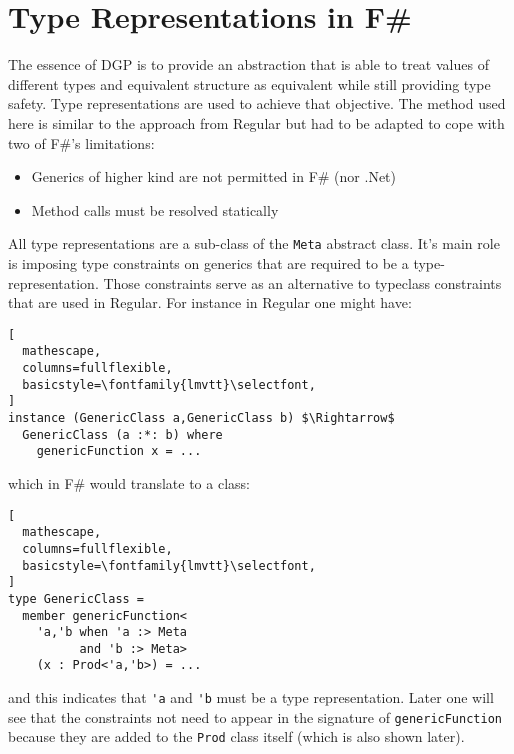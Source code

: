 \documentclass{sigplanconf}
\begin{document}
\section{Type Representations in F\#}
The essence of DGP is to provide an abstraction that is able to treat values of different types and equivalent structure as equivalent while still providing type safety. Type representations are used to achieve that objective. The method used here is similar to the approach from Regular\cite{Regular} but had to be adapted to cope with two of F\#'s limitations:
\begin{itemize}
\item Generics of higher kind are not permitted in F\# (nor .Net)
\item Method calls must be resolved statically
\end{itemize}
All type representations are a sub-class of the \verb+Meta+ abstract class. It's main role is imposing type constraints on generics that are required to be a type-representation. Those constraints serve as an alternative to typeclass constraints that are used in Regular. For instance in Regular one might have:
\begin{lstlisting}[
  mathescape,
  columns=fullflexible,
  basicstyle=\fontfamily{lmvtt}\selectfont,
]
instance (GenericClass a,GenericClass b) $\Rightarrow$
  GenericClass (a :*: b) where
    genericFunction x = ...
\end{lstlisting}
which in F\# would translate to a class:
\begin{lstlisting}[
  mathescape,
  columns=fullflexible,
  basicstyle=\fontfamily{lmvtt}\selectfont,
]
type GenericClass =
  member genericFunction<
    'a,'b when 'a :> Meta 
          and 'b :> Meta> 
    (x : Prod<'a,'b>) = ...
\end{lstlisting}
and this indicates that \verb+'a+ and \verb+'b+ must be a type representation. Later one will see that the constraints not need to appear in the signature of \verb+genericFunction+ because they are added to the \verb+Prod+ class itself (which is also shown later).
\end{document}
